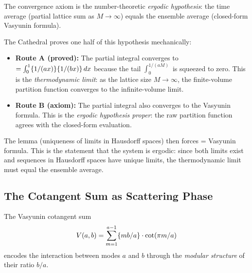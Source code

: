 \documentclass[11pt,a4paper]{article}
\begin{document}
\begin{principle}
The convergence axiom is the number-theoretic \emph{ergodic hypothesis}:
the time average (partial lattice sum as $M \to \infty$) equals the
ensemble average (closed-form Vasyunin formula).

The Cathedral proves one half of this hypothesis mechanically:
\begin{itemize}
  \item \textbf{Route A (proved):} The partial integral converges to
    ~$= \int_0^1 \{1/(ax)\}\{1/(bx)\}\,dx$
    because the tail $\int_0^{1/(aM)}$ is squeezed to zero.
    This is the \emph{thermodynamic limit}: as the lattice size
    $M \to \infty$, the finite-volume partition function converges
    to the infinite-volume limit.
  \item \textbf{Route B (axiom):} The partial integral also converges
    to the Vasyunin formula. This is the \emph{ergodic hypothesis proper}:
    the raw partition function agrees with the closed-form evaluation.
\end{itemize}
The  lemma (uniqueness of limits in
Hausdorff spaces) then forces  = Vasyunin formula.
This is the statement that the system is ergodic: since both limits
exist and sequences in Hausdorff spaces have unique limits, the
thermodynamic limit must equal the ensemble average.
\end{principle}

\subsection{The Cotangent Sum as Scattering Phase}

The Vasyunin cotangent sum
\[
  V(a,b) = \sum_{m=1}^{a-1} \{mb/a\} \cdot \cot(\pi m/a)
\]
encodes the interaction between modes $a$ and $b$ through the
\emph{modular structure} of their ratio $b/a$.
\end{document}
